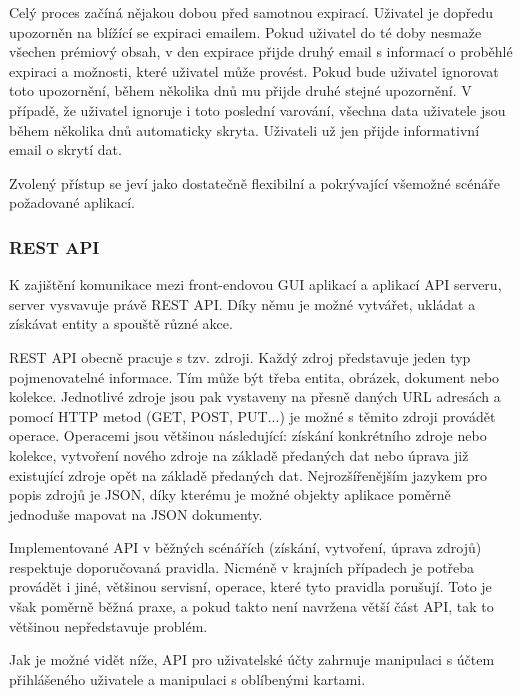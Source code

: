 \begin{itemize}
\begin{itemize}
		Celý proces začíná nějakou dobou před samotnou expirací.
		Uživatel je dopředu upozorněn na blížící se expiraci emailem.
		Pokud uživatel do té doby nesmaže všechen prémiový obsah, v den expirace přijde druhý email s informací o
		proběhlé expiraci a možnosti, které uživatel může provést.
		Pokud bude uživatel ignorovat toto upozornění, během několika dnů mu přijde druhé stejné upozornění.
		V případě, že uživatel ignoruje i toto poslední varování, všechna data uživatele jsou během několika dnů
		automaticky skryta.
		Uživateli už jen přijde informativní email o skrytí dat.

		Zvolený přístup se jeví jako dostatečně flexibilní a pokrývající všemožné scénáře požadované aplikací.

		\subsubsection{REST API}

		K zajištění komunikace mezi front-endovou \ac{GUI} aplikací a aplikací \ac{API} serveru, server
		vysvavuje právě \ac{REST} \ac{API}.
		Díky němu je možné vytvářet, ukládat a získávat entity a spouště různé akce.

		\ac{REST} \ac{API} obecně pracuje s tzv. zdroji.
		Každý zdroj představuje jeden typ pojmenovatelné informace.
		Tím může být třeba entita, obrázek, dokument nebo kolekce.
		Jednotlivé zdroje jsou pak vystaveny na přesně daných \ac{URL} adresách a pomocí \ac{HTTP} metod (GET, POST, PUT...)
		je možné s těmito zdroji provádět operace.
		Operacemi jsou většinou následující: získání konkrétního zdroje nebo kolekce, vytvoření nového zdroje na základě
		předaných dat nebo úprava již existující zdroje opět na základě předaných dat.
		Nejrozšířenějším jazykem pro popis zdrojů je \ac{JSON}, díky kterému je možné objekty aplikace poměrně jednoduše
		mapovat na \ac{JSON} dokumenty. \cite{restfulapi}

		Implementované \ac{API} v běžných scénářích (získání, vytvoření, úprava zdrojů) respektuje doporučovaná pravidla.
		Nicméně v krajních případech je potřeba provádět i jiné, většinou servisní, operace, které tyto pravidla porušují.
		Toto je však poměrně běžná praxe, a pokud takto není navržena větší část \ac{API}, tak to většinou nepředstavuje
		problém.

		Jak je možné vidět níže, \ac{API} pro uživatelské účty zahrnuje manipulaci s účtem přihlášeného uživatele a manipulaci
		s oblíbenými kartami.


\end{itemize}
\end{itemize}
